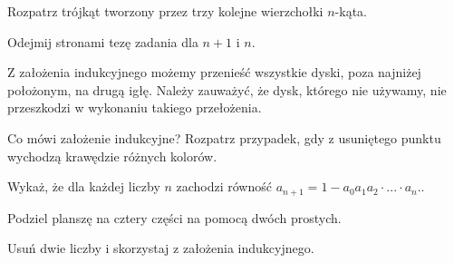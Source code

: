 \newpage
{}

\begin{hints_list}

	\item Rozpatrz trójkąt tworzony przez trzy kolejne wierzchołki $n$-kąta.

	\item Odejmij stronami tezę zadania dla $n + 1$ i $n$.

	\item Z założenia indukcyjnego możemy przenieść wszystkie dyski, poza najniżej położonym, na drugą igłę. Należy zauważyć, że dysk, którego nie używamy, nie przeszkodzi w wykonaniu takiego przełożenia.

	\item Co mówi założenie indukcyjne? Rozpatrz przypadek, gdy z usuniętego punktu wychodzą krawędzie różnych kolorów.

	\item Wykaż, że dla każdej liczby $n$ zachodzi równość $a_{n + 1} = 1 - a_0a_1a_2\cdot ... \cdot a_{n}.$.

	\item Podziel planszę na cztery części na pomocą dwóch prostych.

	\item Usuń dwie liczby i skorzystaj z założenia indukcyjnego.
\end{hints_list}